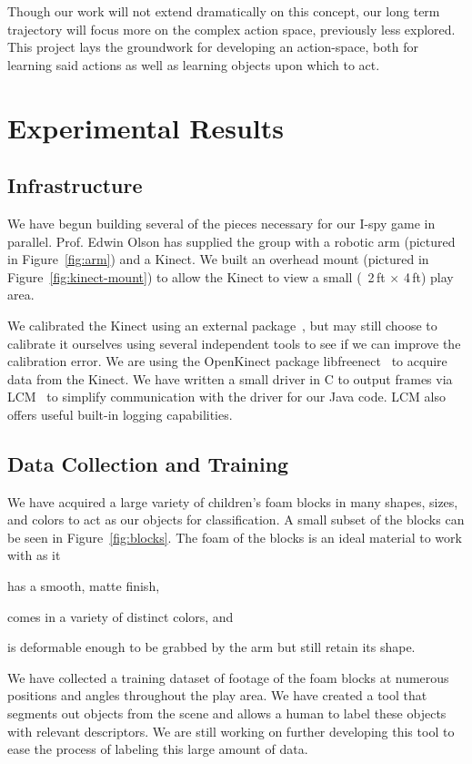 \documentclass[11pt]{article}
\begin{document}
Though our work will not extend dramatically on this concept, our long term
trajectory will focus more on the complex action space, previously less explored.
This project lays the groundwork for developing an action-space, both for
learning said actions as well as learning objects upon which to act.

\section{Experimental Results}
\subsection{Infrastructure}
We have begun building several of the pieces necessary for our I-spy
game in parallel.  Prof. Edwin Olson has supplied the group with a robotic
arm (pictured in Figure~\ref{fig:arm}) and a Kinect.  We built an
overhead mount (pictured in Figure~\ref{fig:kinect-mount}) to allow the Kinect
to view a small (~2\,ft $\times$ 4\,ft) play area.

We calibrated the Kinect using an external package~\cite{rgbdemo}, but may still
choose to calibrate it ourselves using several independent tools to see if we
can improve the calibration error. We are using the OpenKinect
package libfreenect~\cite{OpenKinect} to acquire data from the Kinect.  We have
written a small driver in C to output frames via LCM~\cite{huang2010} to simplify
communication with the driver for our Java code.  LCM also offers useful
built-in logging capabilities.

\subsection{Data Collection and Training}
We have acquired a large variety of children's foam blocks in many shapes, sizes,
and colors to act as our objects for classification. A small subset of the
blocks can be seen in Figure~\ref{fig:blocks}. The foam of the blocks is an
ideal material to work with as it
\begin{inparaenum}[(1)]
\item has a smooth, matte finish,
\item comes in a variety of distinct colors, and
\item is deformable enough to be grabbed by the arm but still retain its
shape.
\end{inparaenum}

We have collected a training dataset of footage of the foam blocks at numerous
positions and angles throughout the play area. We have created a tool that
segments out objects from the scene and allows a human to label these objects
with relevant descriptors.  We are still working on further developing this
tool to ease the process of labeling this large amount of data.
\end{document}
